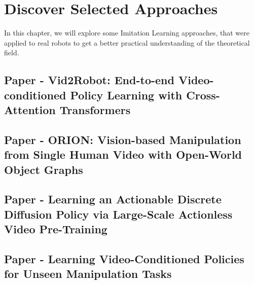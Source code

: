\chapter{Discover Selected Approaches}
In this chapter, we will explore some Imitation Learning approaches, that were applied to real robots to get a better practical understanding of the theoretical field. 

\section{Paper - Vid2Robot: End-to-end Video-conditioned Policy Learning with Cross-Attention Transformers}



\section{Paper - ORION: Vision-based Manipulation from Single Human Video with Open-World Object Graphs}
\section{Paper - Learning an Actionable Discrete Diffusion Policy via Large-Scale Actionless Video Pre-Training}

\section{Paper - Learning Video-Conditioned Policies for Unseen Manipulation Tasks}